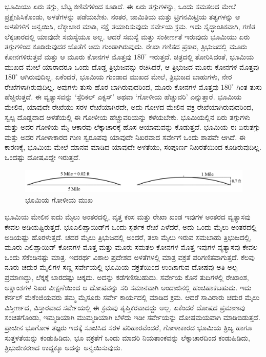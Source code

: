 ಭೂಮಿಯು ಏರು ತಗ್ಗು, ಬೆಟ್ಟ ಕಣಿವೆಗಳಿಂದ ಕೂಡಿದೆ. ಈ ಏರು ತಗ್ಗುಗಳನ್ನು, ಒಂದು ಸಮತಲದ ಮೇಲೆ ಪ್ರಕ್ಷೇಪಿಸಿಕೊಂಡು, ಅಳತೆಗಳನ್ನು ಪಡೆಯಬೇಕು. ನಂತರ, ಜಾಮಿತಿಯ ಮತ್ತು ಟ್ರಿಗನಮಿಟ್ರಿಯ ತತ್ವಗಳನ್ನು ಆ ಅಳತೆಗಳಿಗೆ ಅನ್ವಯಿಸಿ, ಲೆಕ್ಕಾಚಾರ ಮಾಡಿ, ನಕ್ಷೆ ತಯಾರಿಸುವುದು ಸರ್ವೇಯ ಕ್ರಮ. ಇದು ಸೈದ್ಧಾಂತಿಕವಾಗಿ, ಗಣಿತ ಲೆಕ್ಕಚಾರದಲ್ಲಿ ಯಾವುದೇ ಸಮಸ್ಯೆಯೂ ಅಲ್ಲ. ಆದರೆ ಸಮಸ್ಯೆ ಮತ್ತು ಸಂಕೀರ್ಣತೆ ಇರುವುದು ಭೂಮಿಯು ಏರು ತಗ್ಗುಗಳಿಂದ ಕೂಡಿರುವುದರ ಜೊತೆಗೆ ಅದು ಗುಂಡಾಗಿರುವುದು. ರೇಖಾ ಗಣಿತದ ಪ್ರಕಾರ, ತ್ರಿಭುಜದಲ್ಲಿ ಮೂರು ಕೋನಗಳಿರುತ್ತವೆ ಮತ್ತು ಆ ಮೂರು ಕೋನಗಳ ಮೊತ್ತವು $180^\circ$ ಇರುತ್ತದೆ. ಚಿತ್ರದಲ್ಲಿ ತೋರಿಸಿದಂತೆ, ಭೂಮಿಯ ಮುಖದ ಮೇಲೆ ಯಾರಾದರೂ ಒಂದು ದೊಡ್ಡ ತ್ರಿಭುಜವನ್ನು ರಚಿಸಿದರೆ, ಆ ತ್ರಿಭುಜದ ಮೂರು ಕೋನಗಳ ಮೊತ್ತವು $180^\circ$ ಆಗಿರುವುದಿಲ್ಲ. ಏಕೆಂದರೆ, ಭೂಮಿಯ ಗುಂಡಾದ ಮುಖದ ಮೇಲೆ, ತ್ರಿಭುಜದ ಬಾಹುಗಳು, ನೇರ ರೇಖೆಗಳಾಗಿರುವುದಿಲ್ಲ. ಅವುಗಳು ತುಸು ಹೊರ ಬಾಗಿರುವುದರಿಂದ, ಮೂರು ಕೋನಗಳ ಮೊತ್ತವು $180^\circ$ ಗಿಂತ ತುಸು ಹೆಚ್ಚಿರುತ್ತದೆ. ಈ ವ್ಯತ್ಯಾಸವನ್ನು ‘ಸ್ಪೆರಿಕಲ್​ ಎಕ್ಸಸ್​’ ಅಥವಾ ‘ಗೋಳೀಯ ಹೆಚ್ಚುವರಿ’ ಎನ್ನುತ್ತಾರೆ. ಭೂಮಿಯ ಮೇಲಿನ, ಯಾವುದೇ ರೇಖೆಯು ಸರಳ ರೇಖೆಯಾಗಿರದೇ, ಅದು ಗೋಳದ ಮೇಲಿನ ವಕ್ರ ರೇಖೆಯಾಗಿರುವುದರಿಂದ, ಸ್ವಲ್ಪ ದೊಡ್ಡದಾದ ಅಳತೆಯಲ್ಲಿ ಈ ಗೋಳೀಯ ಹೆಚ್ಚುವರಿಯನ್ನು ಕಳೆಯಬೇಕು. ಭೂಮಿಯಲ್ಲಿನ ಏರು ತಗ್ಗುಗಳು ಮತ್ತು ಅದರ ಗೋಳಿಯ ಮೈ ಆಕಾರವು ಲೆಕ್ಕಾಚಾರಕ್ಕೆ ಹೊಸ ಆಯಾಮವನ್ನು ಕೊಡುತ್ತದೆ. ಭೂಮಿಯ ಈ ಏರುತಗ್ಗು ಮತ್ತು ಅದರ ಗೋಳಾಕಾರದ ಗುಣ ಸ್ವರೂಪವು ಯಾವುದೇ ನಿಖರವಾದ ಸರ್ವೇಗೆ ಒಂದು ಶಾಪವೇ ಆಗಿದೆ. ಈ ಕಾರಣಕ್ಕೆ, ಭೂಮಿಯ ಮೇಲೆ ಮಾನವ ಮಾಡಿದ ಯಾವುದೇ ಅಳತೆಯು, ಸಂಪೂರ್ಣ ನಿಖರತೆಯಿಂದ ಕೂಡಿರುವುದಿಲ್ಲ. ಒಂದಷ್ಟು ದೋಷವಿದ್ದೇ ಇರುತ್ತದೆ.

\begin{figure}[!htbp]
\includegraphics[scale=1.05]{"images/image002.jpg"}
\caption{ಭೂಮಿಯ ಗೋಳೀಯ ಮುಖ}\label{chap2-fig02}
\end{figure}

ಭೂಮಿಯ ಮೇಲಿನ ಐದು ಮೈಲು ಅಂತರದಲ್ಲಿ, ವೃತ್ತ ಕಂಸ ಮತ್ತು ರೇಖಾ ಖಂಡ ಇವುಗಳ ಅಂತರದ ವ್ಯತ್ಯಾಸವು ಕೇವಲ  ಅಡಿಯಷ್ಟಿರುತ್ತದೆ. ಭೂಎಲಿಪ್ಸಾಯಿಡ್​ಗೆ ಒಂದು ಸ್ಪರ್ಶಕ ರೇಖೆ ಎಳೆದರೆ, ಅದು ಒಂದು ಮೈಲು ಅಂತರದಲ್ಲಿ  ಅಡಿಯಷ್ಟು ಹೊರಳುತ್ತದೆ.  ಚದರ ಮೈಲು ತ್ರಿಭುಜದಲ್ಲಿ ಅಂದರೆ, ತಲಾ  ಮೈಲು ಇರುವ ಸಮಬಾಹು ತ್ರಿಭುಜದಲ್ಲಿ, ಮೂರು ಎಲಿಪ್ಸಾಯಿಡ್​ ಕೋನಗಳ ಮೊತ್ತ ಮತ್ತು ಮೂರು ಸಮತಲ ಕೋನಗಳ ಮೊತ್ತ ಇವುಗಳ ವ್ಯತ್ಯಾಸವು ಕೇವಲ ಒಂದು ಸೆಕೆಂಡಿನಷ್ಟು ಮಾತ್ರ. ಇದರರ್ಥ ವಿಶಾಲ ಪ್ರದೇಶದ ಅಳತೆಗಳಲ್ಲಿ ಮಾತ್ರ ವಕ್ರತೆ ಪರಿಗಣಿತವಾಗುತ್ತದೆ. ಕೆಲವು ನೂರು ಚದುರ ಮೈಲಿಗಳ ಸಣ್ಣ ಸರ್ವೇಯಲ್ಲಿ ಭೂಮಿಯ ವಕ್ರತೆಯಿಂದ ಉಂಟಾಗುವ ದೋಷವು ಅತಿ ಅಲ್ಪ ಪ್ರಮಾಣದ್ದು, ಲೆಕ್ಕಕ್ಕೆ ಬಾರದಷ್ಟು ಚಿಕ್ಕದು. ಅದನ್ನು ಕಡೆಗಣಿಸಬಹುದು. ಸರ್ವೇಯ ಕೊನೆ ತುದಿಗಳಲ್ಲಿ ರೇಖಾಂಶ, ಅಕ್ಷಾಂಶಗಳ ನಿಖರ ವೀಕ್ಷಣೆಯಿಂದ ಆ ದೋಷವನ್ನು ಸರಿ ಸಮಾನವಾಗಿ ಅಂದಾಜಿನಲ್ಲಿ ಹಂಚಿಹಾಕಬಹುದು. ಇದು ಕರ್ನಲ್​ ಮೆಕೆಂಜಿಯವರು ತಮ್ಮ ಮೈಸೂರು ಸರ್ವೇ ಕಾರ್ಯದಲ್ಲಿ ಮಾಡಿದ ಕ್ರಮ. ಆದರೆ ಸಾವಿರಾರು ಚದುರ ಮೈಲು ವಿಸ್ತೀರ್ಣದ, ವಿಸ್ತಾರವಾದ ಸರ್ವೇಯಲ್ಲಿ ಈ ಕ್ರಮವು ತೃಪ್ತಿಕರವಾದದ್ದು ಅಲ್ಲ. ಏಕೆಂದರೆ ದೋಷದ ಪ್ರಮಾಣವು ಸಂಚಿತಗೊಂಡು, ಇಮ್ಮಡಿಯಾಗಿ ಮುಮ್ಮಡಿಯಾಗಿ ಬೆಳೆದು ಇಡೀ ಸರ್ವೇಯನ್ನು ದೋಷಮಯವಾಗಿ ಮಾಡಿಬಿಡುತ್ತದೆ. ಪ್ರಾಚೀನ ಭೂಗೋಳ ತಜ್ಞರು ಇದಕ್ಕೆ ಸೂಚಿಸಿದ ಸರಳ ಪರಿಹಾರವೆಂದರೆ, ಗೋಳಾಕಾರದ ಭೂಮಿಯ ತ್ರಿಜ್ಯ ಹಾಗೂ ಸುತ್ತಳತೆಯನ್ನು ಕಂಡುಹಿಡಿದು, ಭೂ ವಕ್ರತೆಗೆ ಒಂದು ಮಾದರಿ ನಿಯತಾಂಕವನ್ನು ಲೆಕ್ಕಾಚಾರದಿಂದ ಕಂಡುಹಿಡಿದು, ತ್ರಿಭುಜೀಕರಣದ ಉದ್ದಕ್ಕೂ ಅದನ್ನು ಅನ್ವಯಿಸುವುದು.


